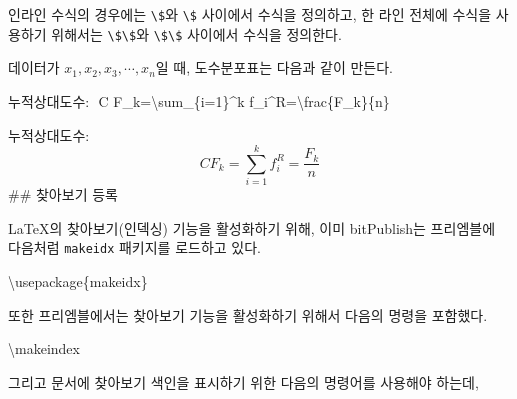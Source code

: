 \documentclass[
  letterpaper,
]{book}
\newenvironment{Shaded}{\begin{snugshade}}{\end{snugshade}}
\newcommand{\BuiltInTok}[1]{\textcolor[rgb]{0.00,0.23,0.31}{#1}}
\newcommand{\ExtensionTok}[1]{\textcolor[rgb]{0.00,0.23,0.31}{#1}}
\newcommand{\FunctionTok}[1]{\textcolor[rgb]{0.28,0.35,0.67}{#1}}
\newcommand{\NormalTok}[1]{\textcolor[rgb]{0.00,0.23,0.31}{#1}}
\newcommand{\SpecialCharTok}[1]{\textcolor[rgb]{0.37,0.37,0.37}{#1}}
\newcommand{\SpecialStringTok}[1]{\textcolor[rgb]{0.13,0.47,0.30}{#1}}
\begin{document}
인라인 수식의 경우에는 \texttt{\textbackslash{}\$}와
\texttt{\textbackslash{}\$} 사이에서 수식을 정의하고, 한 라인 전체에
수식을 사용하기 위해서는 \texttt{\textbackslash{}\$\textbackslash{}\$}와
\texttt{\textbackslash{}\$\textbackslash{}\$} 사이에서 수식을 정의한다.

\begin{Shaded}
\end{Shaded}

데이터가 \(x_1, x_2, x_3, \cdots, x_n\)일 때, 도수분포표는 다음과 같이
만든다.

\begin{Shaded}
\begin{Highlighting}[]
\NormalTok{누적상대도수: }
\SpecialStringTok{$$}
\SpecialStringTok{C F\_k=}\SpecialCharTok{\textbackslash{}sum}\SpecialStringTok{\_\{i=1\}\^{}k f\_i\^{}R=}\SpecialCharTok{\textbackslash{}frac}\SpecialStringTok{\{F\_k\}\{n\}}
\SpecialStringTok{$$}
\end{Highlighting}
\end{Shaded}

누적상대도수: \[
C F_k=\sum_{i=1}^k f_i^R=\frac{F_k}{n}
\] \#\# 찾아보기 등록

LaTeX의 찾아보기(인덱싱) 기능을 활성화하기 위해, 이미 bitPublish는
프리엠블에 다음처럼 \texttt{makeidx} 패키지를 로드하고
있다.

\begin{Shaded}
\begin{Highlighting}[]
\BuiltInTok{\textbackslash{}usepackage}\NormalTok{\{}\ExtensionTok{makeidx}\NormalTok{\}}
\end{Highlighting}
\end{Shaded}

또한 프리엠블에서는 찾아보기 기능을 활성화하기 위해서 다음의 명령을
포함했다.

\begin{Shaded}
\begin{Highlighting}[]
\FunctionTok{\textbackslash{}makeindex}
\end{Highlighting}
\end{Shaded}

그리고 문서에 찾아보기 색인을 표시하기 위한 다음의 명령어를 사용해야
하는데,
\end{document}

